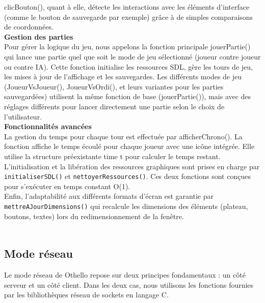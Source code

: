 \documentclass[12pt, a4paper, oneside]{article}
\begin{document}
            clicBouton(), quant à elle, détecte les interactions avec les éléments d'interface (comme le bouton de 
            sauvegarde par exemple) grâce à de simples comparaisons de coordonnées.\\ 

        \textbf{Gestion des parties} \\ 
            Pour gérer la logique du jeu, nous appelons la fonction principale jouerPartie() qui 
            lance une partie quel que soit le mode de jeu sélectionné (joueur contre joueur ou contre IA). Cette 
            fonction initialise les ressources SDL, gère les tours de jeu, les mises à jour de l’affichage 
            et les sauvegardes.
            Les différents modes de jeu (JoueurVsJoueur(), JoueurVsOrdi(), et leurs variantes pour les parties 
            sauvegardées) utilisent la même fonction de base (jouerPartie()), mais avec des réglages différents 
            pour lancer directement une partie selon le choix de l'utilisateur. \\
    
        \textbf{Fonctionnalités avancées} \\ 
            La gestion du temps pour chaque tour est effectuée par afficherChrono(). La fonction affiche le temps écoulé pour chaque joueur avec une icône 
            intégrée. Elle utilise la structure préexistante time\textunderscore
            t pour calculer le temps restant. \\
            L'initialisation et la libération des ressources graphiques sont prises en charge par \texttt{initialiserSDL()} 
            et \texttt{nettoyerRessources()}. Ces deux fonctions sont conçues pour s'exécuter en temps constant O(1). \\
            Enfin, l'adaptabilité aux différents formats d'écran est garantie par \texttt{mettreAJourDimensions()} qui 
            recalcule les dimensions des éléments (plateau, boutons, textes) lors du redimensionnement de la fenêtre. \\\\
            

            \subsection{Mode réseau}
    
            Le mode réseau de Othello repose sur deux principes fondamentaux : un côté serveur et un côté client. Dans les deux cas, nous utilisons les fonctions fournies par les bibliothèques réseau de sockets en langage C.
            
\end{document}
